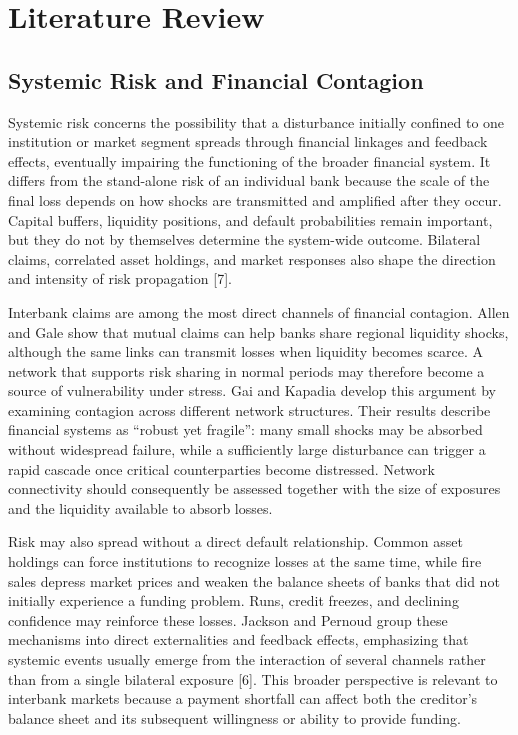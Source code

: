\chapter{Literature Review}

\section{Systemic Risk and Financial Contagion}

Systemic risk concerns the possibility that a disturbance initially
confined to one institution or market segment spreads through financial
linkages and feedback effects, eventually impairing the functioning of
the broader financial system. It differs from the stand-alone risk of an
individual bank because the scale of the final loss depends on how
shocks are transmitted and amplified after they occur. Capital buffers,
liquidity positions, and default probabilities remain important, but
they do not by themselves determine the system-wide outcome. Bilateral
claims, correlated asset holdings, and market responses also shape the
direction and intensity of risk propagation {[}7{]}.

Interbank claims are among the most direct channels of financial
contagion. Allen and Gale show that mutual claims can help banks share
regional liquidity shocks, although the same links can transmit losses
when liquidity becomes scarce. A network that supports risk sharing in
normal periods may therefore become a source of vulnerability under
stress. Gai and Kapadia develop this argument by examining contagion
across different network structures. Their results describe financial
systems as ``robust yet fragile'': many small shocks may be absorbed
without widespread failure, while a sufficiently large disturbance can
trigger a rapid cascade once critical counterparties become distressed.
Network connectivity should consequently be assessed together with the
size of exposures and the liquidity available to absorb losses.

Risk may also spread without a direct default relationship. Common asset
holdings can force institutions to recognize losses at the same time,
while fire sales depress market prices and weaken the balance sheets of
banks that did not initially experience a funding problem. Runs, credit
freezes, and declining confidence may reinforce these losses. Jackson
and Pernoud group these mechanisms into direct externalities and
feedback effects, emphasizing that systemic events usually emerge from
the interaction of several channels rather than from a single bilateral
exposure {[}6{]}. This broader perspective is relevant to interbank
markets because a payment shortfall can affect both the creditor's
balance sheet and its subsequent willingness or ability to provide
funding.

